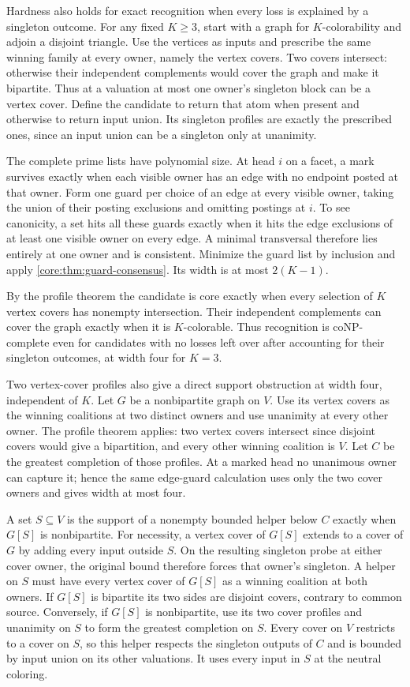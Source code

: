 Hardness also holds for exact recognition when every loss is
explained by a singleton outcome. For any fixed $K\ge3$, start
with a graph for $K$-colorability and adjoin a disjoint triangle.
Use the vertices as inputs and prescribe the same winning family
at every owner, namely the vertex covers. Two covers intersect:
otherwise their independent complements would cover the graph
and make it bipartite.
Thus at a valuation at most one owner's singleton block can
be a vertex cover. Define the candidate to return that atom
when present and otherwise to return input union. Its singleton
profiles are exactly the prescribed ones, since an input union
can be a singleton only at unanimity.

The complete prime lists have polynomial size. At head $i$
on a facet, a mark survives exactly when each visible owner
has an edge with no endpoint posted at that owner. Form one
guard per choice of an edge at every visible owner, taking
the union of their posting exclusions and omitting postings
at $i$. To see canonicity, a set hits all these guards exactly
when it hits the edge exclusions of at least one visible owner
on every edge. A minimal transversal therefore lies entirely
at one owner and is consistent. Minimize the guard list by
inclusion and apply \cref{core:thm:guard-consensus}.
Its width is at most $2(K-1)$.

By the profile theorem the candidate is core exactly when
every selection of $K$ vertex covers has nonempty intersection.
Their independent complements can cover the graph exactly
when it is $K$-colorable. Thus recognition is coNP-complete
even for candidates with no losses left over after accounting
for their singleton outcomes, at width four for $K=3$.

Two vertex-cover profiles also give a direct support
obstruction at width four, independent of $K$. Let $G$ be a
nonbipartite graph on $V$. Use its vertex covers as the winning
coalitions at two distinct owners and use unanimity at every
other owner. The profile theorem applies: two vertex covers
intersect since disjoint covers would give a bipartition,
and every other winning coalition is $V$. Let $C$ be the
greatest completion of those profiles. At a marked head no
unanimous owner can capture it; hence the same edge-guard
calculation uses only the two cover owners and gives width
at most four.

A set $S\subseteq V$ is the support of a nonempty bounded
helper below $C$ exactly when $G[S]$ is nonbipartite. For
necessity, a vertex cover of $G[S]$ extends to a cover of
$G$ by adding every input outside $S$. On the resulting
singleton probe at either cover owner, the original bound
therefore forces that owner's singleton. A helper on $S$
must have every vertex cover of $G[S]$ as a winning
coalition at both owners. If $G[S]$ is bipartite its two
sides are disjoint covers, contrary to common source.
Conversely, if $G[S]$ is nonbipartite, use its two cover
profiles and unanimity on $S$ to form the greatest completion
on $S$. Every cover on $V$ restricts to a cover on $S$, so
this helper respects the singleton outputs of $C$ and is
bounded by input union on its other valuations. It uses
every input in $S$ at the neutral coloring.

